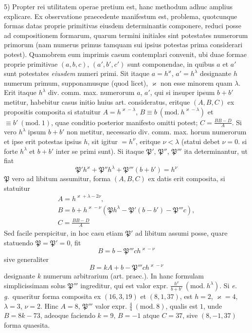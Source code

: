 5) Propter rei utilitatem operae pretium est, hanc methodum adhuc amplius explicare. Ex observatione praecedente manifestum est, problema, quotcunque formas datas proprie primitivas eiusdem determinantis componere, reduci posse ad compositionem formarum, quarum termini initiales sint potestates numerorum primorum (nam numerus primus tamquam sui ipsius potestas prima considerari potest). Quamobrem eum imprimis casum contemplari convenit, ubi duae formae proprie primitivae $(a,b,c)$, $(a',b',c')$ sunt componendae, in quibus $a$ et $a'$ sunt potestates \textit{eiusdem} numeri primi. Sit itaque $a=h^{\varkappa}$, $a'=h^{\lambda}$ designante $h$ numerum primum, supponamusque (quod licet), $\varkappa$ non esse minorem quam $\lambda$. Erit itaque $h^{\lambda}$ div. comm. max. numerorum $a$, $a'$, qui si insuper ipsum $b+b'$ metitur, habebitur casus initio huius art. consideratus, eritque $(A,B,C)$ ex propositis composita si statuitur $A=h^{\varkappa-\lambda}$, $B\equiv b\ (\mathrm{mod.}\ h^{\varkappa-\lambda})$ et $\equiv b'\ (\mathrm{mod.}\ 1)$, quae conditio posterior manifesto omitti potest; $C=\frac{BB-D}{A}$. Si vero $h^{\lambda}$ ipsum $b+b'$ non metitur, necessario div. comm. max. horum numerorum et ipse erit potestas ipsius $h$, sit igitur $=h^{\nu}$, eritque $\nu<\lambda$ (statui debet $\nu=0$. si forte $h^{\lambda}$ et $b+b'$ inter se primi sunt). Si itaque $\mathfrak{P}'$, $\mathfrak{P}''$, $\mathfrak{P}'''$ ita determinantur, ut fiat
\[
\mathfrak{P}'h^{\varkappa}+\mathfrak{P}''h^{\lambda}+\mathfrak{P}'''(b+b')=h^{\nu}
\]
$\mathfrak{P}$ vero ad libitum assumitur, forma $(A,B,C)$ ex datis erit composita, si statuitur
\[
\begin{gathered}A=h^{\varkappa+\lambda-2\nu},\\
B=b+h^{\varkappa-\nu}(\mathfrak{P}h^{\lambda}-\mathfrak{P}'(b-b')-\mathfrak{P}'''c),\\
C=\frac{BB-D}{A}\end{gathered}
\]
Sed facile perspicitur, in hoc casu etiam $\mathfrak{P}'$ ad libitum assumi posse, quare statuendo $\mathfrak{P}=\mathfrak{P}'=0$, fit
\[
B=b-\mathfrak{P}'''ch^{\varkappa-\nu}
\]
sive generaliter
\[
B=kA+b-\mathfrak{P}'''ch^{\varkappa-\nu}
\]
designante $k$ numerum arbitrarium (art. praec.). In hanc formulam simplicissimam solus $\mathfrak{P}'''$ ingreditur, qui est valor expr. $\frac{h^{\nu}}{b+b'}\ (\mathrm{mod.}\ h^{\lambda})$. Si \textit{e. g.}\ quaeritur forma composita ex $(16,3,19)$ et $(8,1,37)$, est $h=2$, $\varkappa=4$, $\lambda=3$, $\nu=2$.
Hinc $A=8$, $\mathfrak{P}'''$ valor expr. $\frac{4}{4}\ (\mathrm{mod.}\ 8)$, qualis est $1$, unde $B=8k-73$, adeoque faciendo $k=9$, $B=-1$ atque $C=37$, sive $(8,-1,37)$ forma quaesita.

